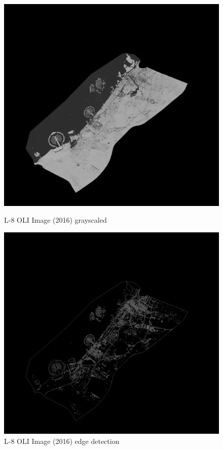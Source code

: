 \begin{figure}[h!]
\centering
\begin{minipage}{.5\textwidth}
	\centering
	\includegraphics[width=\textwidth-3em]{code/imagedata/analysis/street2016cropped_refd_grayscale}
	\caption{L-8 OLI Image (2016) grayscaled}
	\label{fig:greyscale}
\end{minipage}%
\begin{minipage}{.5\textwidth}
	\centering
	\includegraphics[width=\textwidth-3em]{code/imagedata/analysis/street2016cropped_refd_edge}
	\caption{L-8 OLI Image (2016) edge detection}
	\label{fig:edge_detect}
\end{minipage}
\end{figure}

